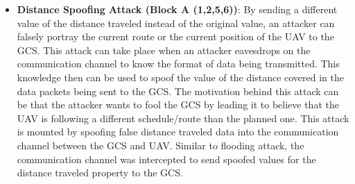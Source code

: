 \begin{itemize}
\item {\bf Distance Spoofing Attack (Block A (1,2,5,6))}: By sending a different value of the distance traveled instead of the original value, an attacker can falsely portray the current route or the current position of the \ac{UAV} to the \ac{GCS}. This attack can take place when an attacker eavesdrops on the communication channel to know the format of data being transmitted. This knowledge then can be used to spoof the value of the distance covered in the data packets being sent to the \ac{GCS}. The motivation behind this attack can be that the attacker wants to fool the \ac{GCS} by leading it to believe that the \ac{UAV} is following a different schedule/route than the planned one. This attack is mounted by spoofing false distance traveled data into the communication channel between the \ac{GCS} and \ac{UAV}. Similar to flooding attack, the communication channel was intercepted to send spoofed values for the distance traveled property to the \ac{GCS}.
\end{itemize}



